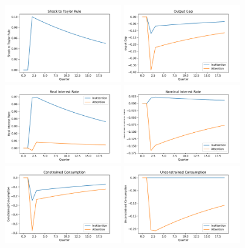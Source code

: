 \documentclass[AER]{AEA}
\begin{document}
\begin{figure}
	\includegraphics[width=0.45\textwidth]{../Code/Dolo/Figures/shock.pdf}
	\includegraphics[width=0.45\textwidth]{../Code/Dolo/Figures/output_gap.pdf}
	\includegraphics[width=0.45\textwidth]{../Code/Dolo/Figures/real_rate.pdf}
	\includegraphics[width=0.45\textwidth]{../Code/Dolo/Figures/nominal_rate.pdf}
	\includegraphics[width=0.45\textwidth]{../Code/Dolo/Figures/constrained.pdf}
	\includegraphics[width=0.45\textwidth]{../Code/Dolo/Figures/unconstrained.pdf}

\end{figure}
\end{document}
